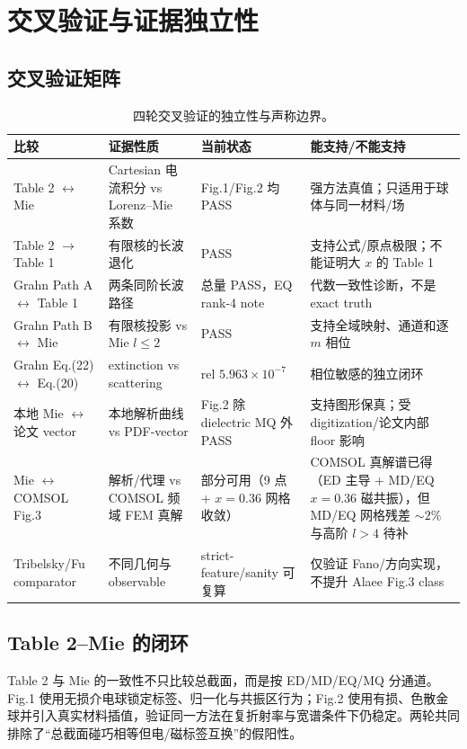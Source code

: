 \section{交叉验证与证据独立性}

\subsection{交叉验证矩阵}

\begin{table}[H]
\centering
\footnotesize
\begin{tabularx}{\textwidth}{p{2.8cm}p{2.7cm}p{2.4cm}X}
\toprule
比较 & 证据性质 & 当前状态 & 能支持/不能支持 \\
\midrule
Table 2 $\leftrightarrow$ Mie & Cartesian 电流积分 vs Lorenz--Mie 系数 & Fig.1/Fig.2 均 PASS & 强方法真值；只适用于球体与同一材料/场 \\
Table 2 $\to$ Table 1 & 有限核的长波退化 & PASS & 支持公式/原点极限；不能证明大 $x$ 的 Table 1 \\
Grahn Path A $\leftrightarrow$ Table 1 & 两条同阶长波路径 & 总量 PASS，EQ rank-4 note & 代数一致性诊断，不是 exact truth \\
Grahn Path B $\leftrightarrow$ Mie & 有限核投影 vs Mie $l\le2$ & PASS & 支持全域映射、通道和逐 $m$ 相位 \\
Grahn Eq.(22) $\leftrightarrow$ Eq.(20) & extinction vs scattering & rel $5.963\times10^{-7}$ & 相位敏感的独立闭环 \\
本地 Mie $\leftrightarrow$ 论文 vector & 本地解析曲线 vs PDF-vector & Fig.2 除 dielectric MQ 外 PASS & 支持图形保真；受 digitization/论文内部 floor 影响 \\
Mie $\leftrightarrow$ COMSOL Fig.3 & 解析/代理 vs COMSOL 频域 FEM 真解 & 部分可用（9 点 + $x=0.36$ 网格收敛）& COMSOL 真解谱已得（ED 主导 + MD/EQ $x=0.36$ 磁共振），但 MD/EQ 网格残差 $\sim2\%$ 与高阶 $l>4$ 待补 \\
Tribelsky/Fu comparator & 不同几何与 observable & strict-feature/sanity 可复算 & 仅验证 Fano/方向实现，不提升 Alaee Fig.3 class \\
\bottomrule
\end{tabularx}
\caption{四轮交叉验证的独立性与声称边界。}
\end{table}

\subsection{Table 2--Mie 的闭环}

Table 2 与 Mie 的一致性不只比较总截面，而是按 ED/MD/EQ/MQ 分通道。Fig.1 使用无损介电球锁定标签、归一化与共振区行为；Fig.2 使用有损、色散金球并引入真实材料插值，验证同一方法在复折射率与宽谱条件下仍稳定。两轮共同排除了“总截面碰巧相等但电/磁标签互换”的假阳性。

